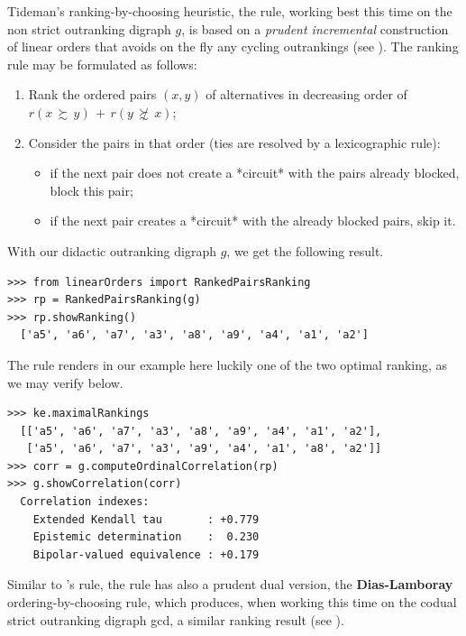 Tideman's ranking-by-choosing heuristic, the \RankedPairs rule, working best this time on the non strict outranking digraph $g$, is based on a \emph{prudent incremental} construction of linear orders that avoids on the fly any cycling outrankings (see \citep{LAM-2009}). The ranking rule may be formulated as follows:
\begin{enumerate}
 \item Rank the ordered pairs $(x,y)$ of alternatives in decreasing order of $r(x\, \succsim \,y) \,+\, r(y\, \not\succsim \,x)$;
 \item Consider the pairs in that order (ties are resolved by a lexicographic rule):
   \begin{itemize}
     \item if the next pair does not create a *circuit* with the pairs already blocked, block this pair;
     \item if the next pair creates a *circuit* with the already blocked pairs, skip it.
    \end{itemize}
\end{enumerate}
With our didactic outranking digraph $g$, we get the following result.

\begin{lstlisting}[caption={Computing a \RankedPairs ranking},label=list:8.15]   
>>> from linearOrders import RankedPairsRanking
>>> rp = RankedPairsRanking(g)
>>> rp.showRanking()
  ['a5', 'a6', 'a7', 'a3', 'a8', 'a9', 'a4', 'a1', 'a2']
\end{lstlisting}

The \RankedPairs rule renders in our example here luckily one of the two optimal \Kemeny ranking, as we may verify below.
 
\begin{lstlisting}
>>> ke.maximalRankings
  [['a5', 'a6', 'a7', 'a3', 'a8', 'a9', 'a4', 'a1', 'a2'],
   ['a5', 'a6', 'a7', 'a3', 'a9', 'a4', 'a1', 'a8', 'a2']]
>>> corr = g.computeOrdinalCorrelation(rp)
>>> g.showCorrelation(corr)
  Correlation indexes:
    Extended Kendall tau       : +0.779
    Epistemic determination    :  0.230
    Bipolar-valued equivalence : +0.179
\end{lstlisting}

Similar to \Kohler 's rule, the \RankedPairs rule has also a prudent dual version, the \textbf{Dias-Lamboray} ordering-by-choosing rule, which produces, when working this time on the codual strict outranking digraph gcd, a similar ranking result (see \citep{LAM-2009,DIA-2010}).

